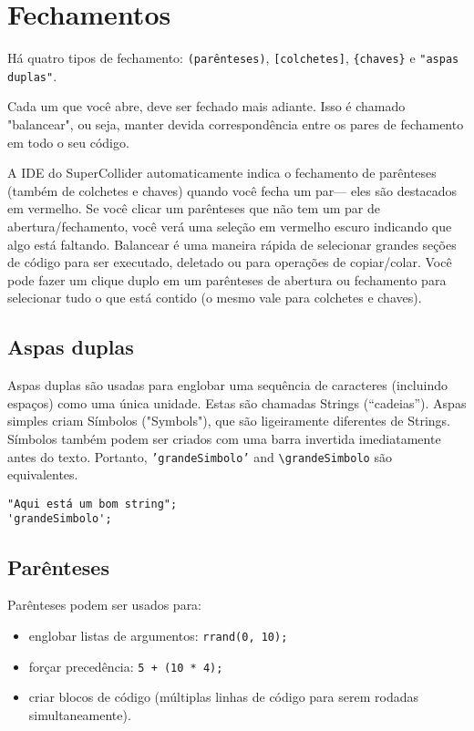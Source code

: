 \section{Fechamentos}

Há quatro tipos de fechamento: \texttt{(parênteses)}, \texttt{[colchetes]}, \texttt{\{chaves\}} e \texttt{"aspas duplas"}.

Cada um que você abre, deve ser fechado mais adiante. Isso é chamado "balancear", ou seja, manter devida correspondência entre os pares de fechamento em todo o seu código.

A IDE do SuperCollider automaticamente indica o fechamento de parênteses (também de colchetes e chaves) quando você fecha um par--- eles são destacados em vermelho. Se você clicar um parênteses que não tem um par de abertura/fechamento, você verá uma seleção em vermelho escuro indicando que algo está faltando. Balancear é uma maneira rápida de selecionar grandes seções de código para ser executado, deletado ou para operações de copiar/colar. Você pode fazer um clique duplo em um parênteses de abertura ou fechamento para selecionar tudo o que está contido (o mesmo vale para colchetes e chaves).

\subsection{Aspas duplas}

Aspas duplas são usadas para englobar uma sequência de caracteres (incluindo espaços) como uma única unidade. Estas são chamadas Strings (“cadeias”). Aspas simples criam Símbolos ("Symbols"), que são ligeiramente diferentes de Strings. Símbolos também podem ser criados com uma barra invertida imediatamente antes do texto. Portanto, \texttt{'grandeSimbolo'} and \texttt{\textbackslash grandeSimbolo} são equivalentes.

\begin{lstlisting}[style=SuperCollider-IDE, basicstyle=\scttfamily\footnotesize]
"Aqui está um bom string";
'grandeSimbolo';
\end{lstlisting}

\subsection{Parênteses}

Parênteses podem ser usados para:

\begin{itemize}
\item englobar listas de argumentos: \texttt{rrand(0, 10);}
\item forçar precedência: \texttt{5 + (10 * 4);}
\item criar blocos de código (múltiplas linhas de código para serem rodadas simultaneamente).
\end{itemize} 

